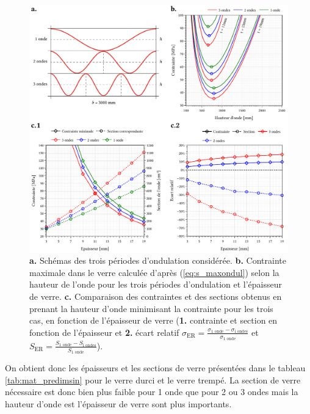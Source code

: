 \documentclass[11pt,titlepage]{article}
\begin{document}
\begin{figure}[H]
    \centering
    \includegraphics[width=\linewidth]{img/ondul/predim.pdf}
    \caption{\textbf{a.} Schémas des trois périodes d'ondulation considérée. \textbf{b.} Contrainte maximale dans le verre calculée d'après (\ref{eq:s_maxondul}) selon la hauteur de l'onde pour les trois périodes d'ondulation et l'épaisseur de verre. \textbf{c.} Comparaison des contraintes et des sections obtenus en prenant la hauteur d'onde minimisant la contrainte pour les trois cas, en fonction de l'épaisseur de verre (\textbf{1.} contrainte et section en fonction de l'épaisseur et \textbf{2.} écart relatif $\sigma_{\text{ER}} = \frac{\sigma_{\text{1 onde}}-\sigma_{\text{i ondes}}}{\sigma_{\text{1 onde}}}$ et $S_{\text{ER}} = \frac{S_{\text{1 onde}}-S_{\text{i ondes}}}{S_{\text{1 onde}}}$).}
    \label{fig:sin_predim}
\end{figure}
On obtient donc les épaisseurs et les sections de verre présentées dans le tableau \ref{tab:mat_predimsin} pour le verre durci et le verre trempé. La section de verre nécessaire est donc bien plus faible pour 1 onde que pour 2 ou 3 ondes mais la hauteur d'onde est l'épaisseur de verre sont plus importants. 
\end{document}
